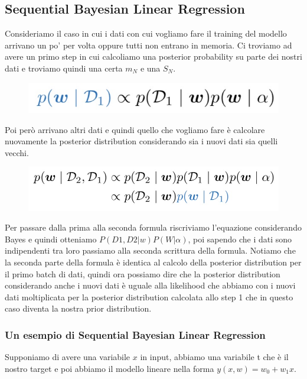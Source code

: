 \documentclass[14pt]{extreport}
\begin{document}
\subsection{Sequential Bayesian Linear Regression}

Consideriamo il caso in cui i dati con cui vogliamo fare il training del modello arrivano un po' per volta oppure tutti non entrano in memoria. Ci
troviamo ad avere un primo step in cui calcoliamo una posterior probability su parte dei nostri dati e troviamo quindi una certa $m_N$ e una $S_N$.

\begin{figure}[H]
\centering
\includegraphics[width=0.7\linewidth]{130.jpeg}
\end{figure}

Poi però arrivano altri dati e quindi quello che vogliamo fare è calcolare nuovamente la posterior distribution considerando sia i nuovi dati sia
quelli vecchi.
\begin{figure}[H]
\centering
\includegraphics[width=0.7\linewidth]{131.jpeg}
\end{figure}

Per passare dalla prima alla seconda formula riscriviamo l'equazione considerando Bayes e quindi otteniamo $P(D1,D2 | w) P(W|\alpha)$, poi sapendo che
i dati sono indipendenti tra loro passiamo alla seconda scrittura della formula. Notiamo che la seconda parte della formula è identica al calcolo
della posterior distribution per il primo batch di dati, quindi ora possiamo dire che la posterior distribution considerando anche i nuovi dati è
uguale alla likelihood che abbiamo con i nuovi dati moltiplicata per la posterior distribution calcolata allo step 1 che in questo caso diventa la
nostra prior distribution.

\subsubsection{Un esempio di Sequential Bayesian Linear Regression}

Supponiamo di avere una variabile $x$ in input, abbiamo una variabile t che è il nostro target e poi abbiamo il modello lineare nella forma $y(x,w) =
w_0 + w_1x$.
\end{document}
